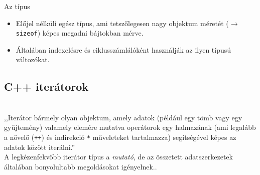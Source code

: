 \begin{frame}
    \begin{exampleblock}{}
        \scriptsize
        
    \end{exampleblock}
\end{frame}

\begin{frame}
    \begin{exampleblock}{}
        \scriptsize
        
    \end{exampleblock}
\end{frame}

\begin{frame}
    Az  típus
    \begin{itemize}
        \item Előjel nélküli egész típus, ami tetszőlegesen nagy objektum méretét ($\to$ \texttt{sizeof}) képes megadni bájtokban mérve.
        \item Általában indexelésre és ciklusszámlálóként használják az ilyen típusú változókat. 
    \end{itemize}
\end{frame}

\subsection{C++ iterátorok}

\begin{frame}
    \begin{description}[m]
        \item[C++ iterátorok] \hfill \\ ,,Iterátor bármely olyan objektum, amely adatok (például egy tömb vagy egy gyűjtemény) valamely elemére mutatva operátorok egy halmazának (ami legalább a növelő (\texttt{++}) és indirekció \texttt{*} műveleteket tartalmazza) segítségével képes az adatok között iterálni.'' \\
        A legkézenfekvőbb iterátor típus a \emph{mutató}, de az összetett adatszerkezetek általában bonyolultabb megoldásokat igényelnek..
    \end{description}
\end{frame}

